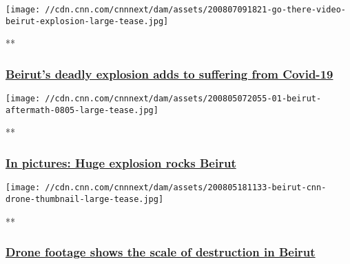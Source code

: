 \href{/videos/world/2020/08/07/beirut-explosion-amplifies-coronavirus-economic-struggles-go-there.cnn}{}

\texttt{[image: //cdn.cnn.com/cnnnext/dam/assets/200807091821-go-there-video-beirut-explosion-large-tease.jpg]}

**

\hypertarget{beiruts-deadly-explosion-adds-to-suffering-from-covid-19}{%
\subsubsection{\texorpdfstring{\href{/videos/world/2020/08/07/beirut-explosion-amplifies-coronavirus-economic-struggles-go-there.cnn}{Beirut's
deadly explosion adds to suffering from
Covid-19}}{Beirut's deadly explosion adds to suffering from Covid-19}}\label{beiruts-deadly-explosion-adds-to-suffering-from-covid-19}}

\href{/2020/08/04/middleeast/gallery/beirut-explosion/index.html}{}

\texttt{[image: //cdn.cnn.com/cnnnext/dam/assets/200805072055-01-beirut-aftermath-0805-large-tease.jpg]}

**

\hypertarget{in-pictures-huge-explosion-rocks-beirut}{%
\subsubsection{\texorpdfstring{\href{/2020/08/04/middleeast/gallery/beirut-explosion/index.html}{In
pictures: Huge explosion rocks
Beirut}}{In pictures: Huge explosion rocks Beirut}}\label{in-pictures-huge-explosion-rocks-beirut}}

\href{/videos/world/2020/08/05/beirut-explosion-lebanon-destruction-drone-video-lon-orig-bks.cnn}{}

\texttt{[image: //cdn.cnn.com/cnnnext/dam/assets/200805181133-beirut-cnn-drone-thumbnail-large-tease.jpg]}

**

\hypertarget{drone-footage-shows-the-scale-of-destruction-in-beirut}{%
\subsubsection{\texorpdfstring{\href{/videos/world/2020/08/05/beirut-explosion-lebanon-destruction-drone-video-lon-orig-bks.cnn}{Drone
footage shows the scale of destruction in
Beirut}}{Drone footage shows the scale of destruction in Beirut}}\label{drone-footage-shows-the-scale-of-destruction-in-beirut}}

